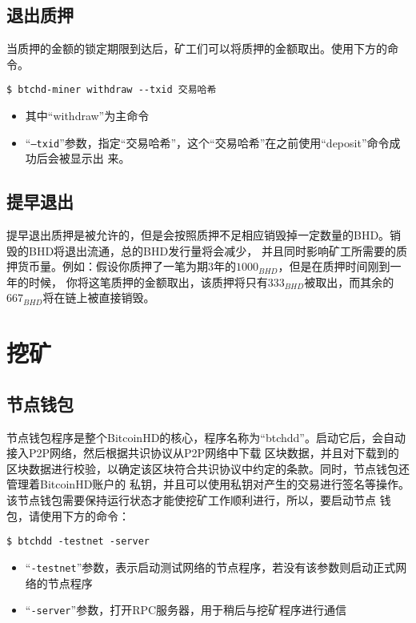 \begin{flushleft}
\subsection{退出质押}
\begin{flushleft}
    当质押的金额的锁定期限到达后，矿工们可以将质押的金额取出。使用下方的命令。
\end{flushleft}
\scriptsize
\begin{verbatim}
$ btchd-miner withdraw --txid 交易哈希
\end{verbatim}
\normalsize
\begin{itemize}
    \item 其中``withdraw''为主命令
    \item ``\texttt{--txid}''参数，指定``交易哈希''，这个``交易哈希''在之前使用``deposit''命令成功后会被显示出
        来。
\end{itemize}
\subsection{提早退出}
\begin{flushleft}
    提早退出质押是被允许的，但是会按照质押不足相应销毁掉一定数量的BHD。销毁的BHD将退出流通，总的BHD发行量将会减少，
    并且同时影响矿工所需要的质押货币量。例如：假设你质押了一笔为期3年的$1000_{BHD}$，但是在质押时间刚到一年的时候，
    你将这笔质押的金额取出，该质押将只有$333_{BHD}$被取出，而其余的$667_{BHD}$将在链上被直接销毁。
\end{flushleft}
\section{挖矿}
\subsection{节点钱包}
\begin{flushleft}
    节点钱包程序是整个BitcoinHD的核心，程序名称为``btchdd''。启动它后，会自动接入P2P网络，然后根据共识协议从P2P网络中下载
    区块数据，并且对下载到的区块数据进行校验，以确定该区块符合共识协议中约定的条款。同时，节点钱包还管理着BitcoinHD账户的
    私钥，并且可以使用私钥对产生的交易进行签名等操作。该节点钱包需要保持运行状态才能使挖矿工作顺利进行，所以，要启动节点
    钱包，请使用下方的命令：
\end{flushleft}
\scriptsize
\begin{verbatim}
$ btchdd -testnet -server
\end{verbatim}
\normalsize
\begin{itemize}
    \item ``\texttt{-testnet}''参数，表示启动测试网络的节点程序，若没有该参数则启动正式网络的节点程序
    \item ``\texttt{-server}''参数，打开RPC服务器，用于稍后与挖矿程序进行通信
\end{itemize}

\end{flushleft}

